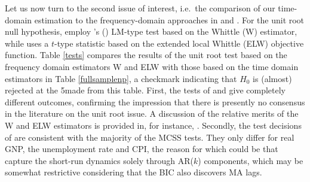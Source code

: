 {{Let us now turn to the second issue of interest, i.e.\ the comparison of our time-domain estimation to the frequency-domain approaches in \textcite{gil1997testing} and \textcite{shimotsu2010exact}. For the unit root null
hypothesis, \textcite{gil1997testing} employ \citeauthor{robinson1994efficient}'s (\citeyear{robinson1994efficient}) LM-type test based on the Whittle (W) estimator, while \textcite{shimotsu2010exact} uses a $t$-type statistic based on
the extended local Whittle (ELW) objective function. Table \ref{tests} compares the results of the unit root test based on the frequency domain estimators W and ELW with those based on the time domain estimators in Table \ref{fullsamplenp}, a checkmark indicating that $H_0$ is (almost) rejected at the 5\be made from this table. First, the tests of \textcite{gil1997testing} and \textcite{shimotsu2010exact} give completely different outcomes, confirming the impression that there is presently no consensus in the literature on the unit root
issue. A discussion of the relative merits of the W and ELW estimators is provided in, for instance, \textcite{hualde2011gaussian}.
Secondly, the test decisions of \textcite{gil1997testing} are consistent with the majority of the MCSS tests. They only differ for real GNP, the unemployment rate and CPI, the reason for which could be that \textcite{gil1997testing} capture the short-run
dynamics solely through AR($k$) components, which may be somewhat restrictive considering that the BIC also discovers MA lags.


}}
